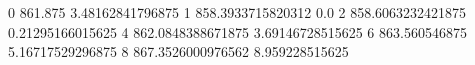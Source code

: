0 861.875 3.48162841796875
1 858.3933715820312 0.0
2 858.6063232421875 0.21295166015625
4 862.0848388671875 3.69146728515625
6 863.560546875 5.16717529296875
8 867.3526000976562 8.959228515625
